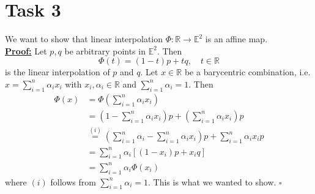 \documentclass[]{article}
\begin{document}
\section*{Task 3}
We want to show that linear interpolation $\Phi : \mathbb{R} \rightarrow \mathbb{E}^2$ is an affine map.\\
\underline{\textbf{Proof:}} Let $p,q$ be arbitrary points in $\mathbb{E}^2$. Then \begin{equation*}
\Phi (t) = (1-t)p + tq, \quad t\in \mathbb{R}
\end{equation*}
is the linear interpolation of $p$ and $q$. Let $x\in \mathbb{R}$ be a barycentric combination, i.e. $x=\sum_{i=1}^{n}\alpha_i x_i$ with $x_i, \alpha_i\in \mathbb{R}$ and $\sum_{i=1}^{n}\alpha_i = 1$. Then \begin{equation*}
\begin{aligned}
\Phi (x) &= \Phi (\sum_{i=1}^{n}\alpha_i x_i)\\
&=(1-\sum_{i=1}^{n}\alpha_i x_i)p + (\sum_{i=1}^{n}\alpha_i x_i)p\\
&\overset{(i)}{=}(\sum_{i=1}^{n}\alpha_i-\sum_{i=1}^{n}\alpha_i x_i)p + \sum_{i=1}^{n}\alpha_i x_ip\\
&=\sum_{i=1}^{n}\alpha_i[(1-x_i)p + x_iq]\\
&=\sum_{i=1}^{n}\alpha_i\Phi(x_i)
\end{aligned}
\end{equation*}
where $(i)$ follows from $\sum_{i=1}^{n}\alpha_i=1$. This is what we wanted to show. $\square$\\

\newpage
\end{document}
